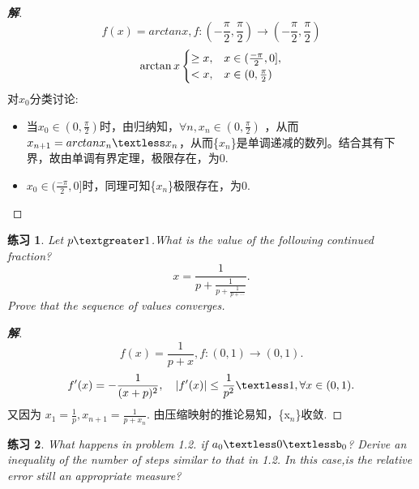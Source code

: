 \documentclass[lang=cn,bibend=bibtex]{elegantpaper}
\theoremstyle{boldexercise}
\newtheorem{exercise}{练习}[section]
\newenvironment{solution}{\begin{proof}[\textbf{\emph 解}]}{\end{proof}}
\begin{document}
\begin{solution}
  \begin{equation}
    \label{eq:1.5.1}
    f(x)=arctanx,  f:(-\frac{\pi}{2},\frac{\pi}{2})\rightarrow (-\frac{\pi}{2},\frac{\pi}{2})
  \end{equation}
  \begin{equation}
    \label{eq:1.5.2}
    \arctan x 
    \begin{cases}
      \ge x,& x \in(\frac{-\pi}{2},0],\\
      \textless x,& x \in (0,\frac{\pi}{2})
    \end{cases}
  \end{equation}
  对$x_0$分类讨论:
  \begin{itemize}
  \item 当$x_0\in(0,\frac{\pi}{2})$时，由归纳知，$\forall n, x_n \in (0,\frac{\pi}{2})$ ，从而$x_{n+1}=arctanx_n\textless x_n$，从而\{$x_n$\}是单调递减的数列。结合其有下界，故由单调有界定理，极限存在，为0.
  \item $x_{0} \in (\frac{-\pi}{2},0]$时，同理可知\{$x_n$\}极限存在，为0.
  \end{itemize}
\end{solution}
\begin{exercise}
  Let $p\textgreater1$.What is the value of the following continued fraction?
  \begin{equation*}
   x=\frac{1}{p+\frac{1}{p+\frac{1}{p+\cdots}}} .
  \end{equation*}
  Prove that the sequence of values converges.
\end{exercise}
\begin{solution}
  \begin{equation}
    \label{eq:1.6.1}
    f(x)=\frac{1}{p+x},f:(0,1)\rightarrow (0,1).
  \end{equation}
  \begin{equation}
    \label{eq:1.6.2}
    f'(x)=-\frac{1}{(x+p)^2}, \quad
    \vert f'(x)\vert \le \frac{1}{p^2} \textless 1, \forall x\in(0,1).
  \end{equation}
     \quad\quad 又因为 $x_1=\frac{1}{p}, x_{n+1}=\frac{1}{p+x_n}.$\quad
  由压缩映射的推论易知，\{x$_n$\}收敛.
\end{solution}
\begin{exercise}
What happens in problem 1.2. if $a_0\textless0\textlessb_0$? Derive an inequality of the number of steps similar to that in 1.2. In this case,is the relative error still an appropriate measure?
\end{exercise}
\end{document}
